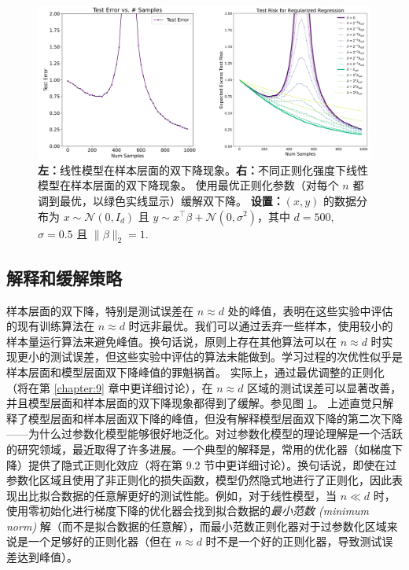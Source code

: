 \begin{figure}[H]
    \centering
    \includegraphics[width=0.9\linewidth]{figs/sample_double_descent.png}
    \caption{\textbf{左：}线性模型在样本层面的双下降现象。\textbf{右：}不同正则化强度下线性模型在样本层面的双下降现象。 使用最优正则化参数（对每个 $n$ 都调到最优，以绿色实线显示）缓解双下降。 \textbf{设置：}$(x, y)$ 的数据分布为 $x \sim \mathcal{N}(0, I_d)$ 且 $y \sim x^\top \beta + \mathcal{N}(0, \sigma^2)$，其中 $d = 500$, $\sigma = 0.5$ 且 $\|\beta\|_2 = 1$.\protect\footnotemark}
    \label{fig:8.11}
\end{figure}

\subsection*{解释和缓解策略}

样本层面的双下降，特别是测试误差在 $n \approx d$ 处的峰值，表明在这些实验中评估的现有训练算法在 $n \approx d$ 时远非最优。我们可以通过丢弃一些样本，使用较小的样本量运行算法来避免峰值。换句话说，原则上存在其他算法可以在 $n \approx d$ 时实现更小的测试误差，但这些实验中评估的算法未能做到。学习过程的次优性似乎是样本层面和模型层面双下降峰值的罪魁祸首。
实际上，通过最优调整的正则化（将在第 \ref{chapter:9} 章中更详细讨论），在 $n \approx d$ 区域的测试误差可以显著改善，并且模型层面和样本层面的双下降现象都得到了缓解。参见图 \ref{fig:8.11}。
上述直觉只解释了模型层面和样本层面双下降的峰值，但没有解释模型层面双下降的第二次下降——为什么过参数化模型能够很好地泛化。对过参数化模型的理论理解是一个活跃的研究领域，最近取得了许多进展。一个典型的解释是，常用的优化器（如梯度下降）提供了隐式正则化效应（将在第 9.2 节中更详细讨论）。换句话说，即使在过参数化区域且使用了非正则化的损失函数，模型仍然隐式地进行了正则化，因此表现出比拟合数据的任意解更好的测试性能。例如，对于线性模型，当 $n \ll d$ 时，使用零初始化进行梯度下降的优化器会找到拟合数据的\textit{最小范数 (minimum norm)} 解（而不是拟合数据的任意解），而最小范数正则化器对于过参数化区域来说是一个足够好的正则化器（但在 $n \approx d$ 时不是一个好的正则化器，导致测试误差达到峰值）。

